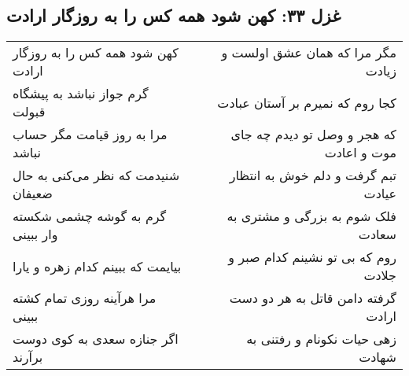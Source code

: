 \begin{center}
\section*{غزل ۳۳: کهن شود همه کس را به روزگار ارادت}
\label{sec:033}
\begin{longtable}{l p{0.5cm} r}
کهن شود همه کس را به روزگار ارادت
&&
مگر مرا که همان عشق اولست و زیادت
\\
گرم جواز نباشد به پیشگاه قبولت
&&
کجا روم که نمیرم بر آستان عبادت
\\
مرا به روز قیامت مگر حساب نباشد
&&
که هجر و وصل تو دیدم چه جای موت و اعادت
\\
شنیدمت که نظر می‌کنی به حال ضعیفان
&&
تبم گرفت و دلم خوش به انتظار عیادت
\\
گرم به گوشه چشمی شکسته وار ببینی
&&
فلک شوم به بزرگی و مشتری به سعادت
\\
بیایمت که ببینم کدام زهره و یارا
&&
روم که بی تو نشینم کدام صبر و جلادت
\\
مرا هرآینه روزی تمام کشته ببینی
&&
گرفته دامن قاتل به هر دو دست ارادت
\\
اگر جنازه سعدی به کوی دوست برآرند
&&
زهی حیات نکونام و رفتنی به شهادت
\\
\end{longtable}
\end{center}
